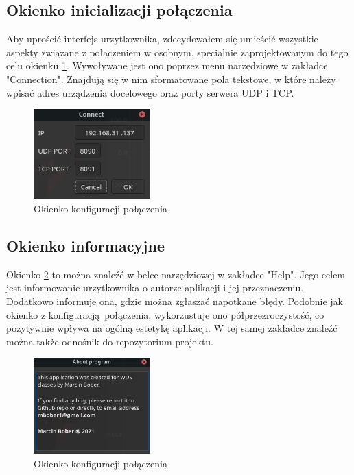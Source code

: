 \documentclass[12pt,a4paper,polish]{article}
\begin{document}
  \subsection{Okienko inicializacji połączenia}
  Aby uprościć interfejs urzytkownika, zdecydowałem się umieścić wszystkie aspekty
  związane z połączeniem w osobnym, specialnie zaprojektowanym do tego celu okienku  \ref{fig:conn}.
  Wywoływane jest ono poprzez menu narzędziowe w zakładce "Connection".
  Znajdują się w nim sformatowane pola tekstowe, w które należy wpisać adres urządzenia
  docelowego oraz porty serwera UDP i TCP.  

  \begin{figure}[h]
    \centering
    \includegraphics[width=0.4\textwidth]{img/final/conn.png}
    \caption{Okienko konfiguracji połączenia}
    \label{fig:conn}
  \end{figure}



  \subsection{Okienko informacyjne}
  Okienko \ref{fig:info} to można znaleźć w belce narzędziowej w zakładce "Help". 
  Jego celem jest informowanie urzytkownika o autorze aplikacji i
  jej przeznaczeniu. Dodatkowo informuje ona, gdzie można zgłaszać
  napotkane błędy. Podobnie jak okienko z konfiguracją połączenia, 
  wykorzustuje ono półprzezroczystość, co pozytywnie wpływa na ogólną
  estetykę aplikacji. W tej samej zakładce znaleźć można także odnośnik
  do repozytorium projektu.

  \begin{figure}[h]
    \centering
    \includegraphics[width=0.4\textwidth]{img/final/info.png}
    \caption{Okienko konfiguracji połączenia}
    \label{fig:info}
  \end{figure}
\end{document}
